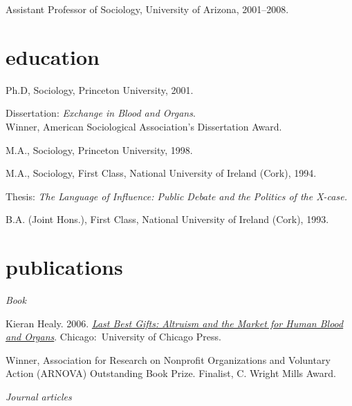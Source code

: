 \documentclass[11pt,oneside,a4paper,DIV=8]{scrartcl}
\begin{document}
Assistant Professor of Sociology, University of Arizona, 2001--2008.



\section{education}


Ph.D, Sociology, Princeton University, 2001.

\hspace{0.35in} \footnotesize Dissertation: \emph{Exchange in Blood and Organs}.\\ Winner, American Sociological Association's Dissertation Award.\normalsize 

M.A., Sociology, Princeton University, 1998. 

%

M.A., Sociology, First Class, National University of Ireland (Cork), 1994.

\hspace{0.35in} \footnotesize Thesis: \emph{The Language of Influence: Public Debate and the Politics of the X-case.} \normalsize 

B.A. (Joint Hons.), First Class, National University of Ireland (Cork), 1993.


 
\section{publications}

\noindent\emph{Book}

Kieran Healy. 2006. \emph{\href{http://www.lastbestgifts.com}{Last Best Gifts: Altruism and the Market for Human Blood and Organs}}. Chicago:~University of Chicago Press. 

\hspace{0.35in} \footnotesize Winner, Association for Research on Nonprofit Organizations and Voluntary Action (ARNOVA) Outstanding Book Prize. Finalist, C. Wright Mills Award. 



\normalsize


\noindent\emph{Journal articles}
 
\end{document}

